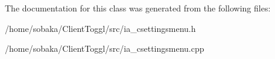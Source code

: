 The documentation for this class was generated from the following files\+:\begin{DoxyCompactItemize}
\item 
/home/sobaka/\+Client\+Toggl/src/ia\+\_\+csettingsmenu.\+h\item 
/home/sobaka/\+Client\+Toggl/src/ia\+\_\+csettingsmenu.\+cpp\end{DoxyCompactItemize}
